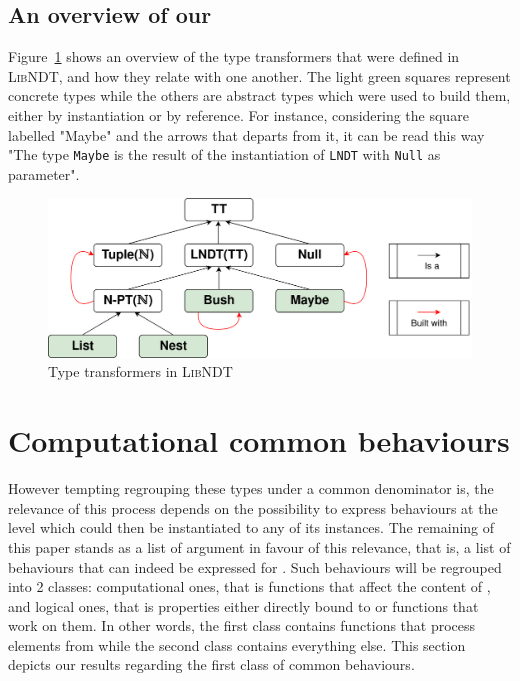 \documentclass[a4paper,UKenglish,cleveref, autoref, thm-restate]{lipics}
\begin{document}
\lndtlistexample

\subsection{An overview of our \linears}\label{ssec:overviewlndt}

Figure~\ref{overview} shows an overview of the type transformers that were defined in \textsc{LibNDT}, and how they relate with one another. The light green squares represent concrete types while the others are abstract types which were used to build them, either by instantiation or by reference. For instance, considering the square labelled "Maybe" and the arrows that departs from it, it can be read this way "The type \texttt{Maybe} is the result of the instantiation of \texttt{LNDT} with \texttt{Null} as parameter".

\begin{figure}[h!]
\centering
\includegraphics[width=.8\textwidth]{type-transformers}
\caption{Type transformers in \textsc{LibNDT}}
\label{overview}
\end{figure}

\section{Computational common behaviours}\label{sec:computational}

However tempting regrouping these types under a common denominator is, the relevance of this process depends on the possibility to express behaviours at the \linear level which could then be instantiated to any of its instances. The remaining of this paper stands as a list of argument in favour of this relevance, that is, a list of behaviours that can indeed be expressed for \linears. Such behaviours will be regrouped into 2 classes: computational ones, that is functions that affect the content of \linears, and logical ones, that is properties either directly bound to \linears or functions that work on them. In other words, the first class contains functions that process elements from \linears while the second class contains everything else. This section depicts our results regarding the first class of common behaviours.
\end{document}
